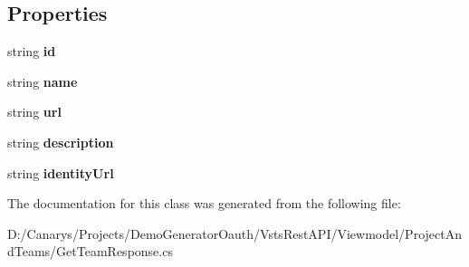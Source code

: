 \subsection*{Properties}
\begin{DoxyCompactItemize}
\item 
\mbox{\label{class_vsts_rest_a_p_i_1_1_viewmodel_1_1_project_and_teams_1_1_get_team_response_1_1_team_a59cfd92d37217a0566520b85dc5783bc}} 
string {\bfseries id}
\item 
\mbox{\label{class_vsts_rest_a_p_i_1_1_viewmodel_1_1_project_and_teams_1_1_get_team_response_1_1_team_aa109c97281b2caf5641627cff42115f6}} 
string {\bfseries name}
\item 
\mbox{\label{class_vsts_rest_a_p_i_1_1_viewmodel_1_1_project_and_teams_1_1_get_team_response_1_1_team_a3b256bbd1b9a36052e78607949502f71}} 
string {\bfseries url}
\item 
\mbox{\label{class_vsts_rest_a_p_i_1_1_viewmodel_1_1_project_and_teams_1_1_get_team_response_1_1_team_a18107ae513aa399eb8f10414a08ec327}} 
string {\bfseries description}
\item 
\mbox{\label{class_vsts_rest_a_p_i_1_1_viewmodel_1_1_project_and_teams_1_1_get_team_response_1_1_team_a3cbd8c2ef7a550d34a05f5b0017fc585}} 
string {\bfseries identity\+Url}
\end{DoxyCompactItemize}


The documentation for this class was generated from the following file\+:\begin{DoxyCompactItemize}
\item 
D\+:/\+Canarys/\+Projects/\+Demo\+Generator\+Oauth/\+Vsts\+Rest\+A\+P\+I/\+Viewmodel/\+Project\+And\+Teams/Get\+Team\+Response.\+cs\end{DoxyCompactItemize}
